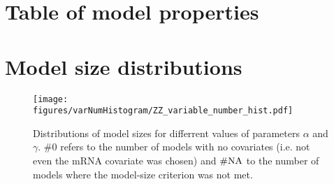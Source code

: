 \documentclass[english,12pt,a4paper,pdftex,elec,utf8]{aaltothesis}
\begin{document}
\clearpage

{}














\clearpage
\thesisappendix

\section{Table of model properties\label{app:full-model-table}}



\section{Model size distributions\label{app:model-sizes}}

\begin{figure}[htb]
  \centering
  \texttt{[image: figures/varNumHistogram/ZZ\_variable\_number\_hist.pdf]}
  \caption{Distributions of model sizes for differrent values of parameters $\alpha$ and $\gamma$.
  $\# 0$ refers to the number of models with no covariates (i.e. not even the mRNA covariate was chosen)
  and $\# \textup{NA}$ to the number of models where the model-size criterion was not met.}
  \label{fig:model-size-distribution}
\end{figure}



\end{document}
